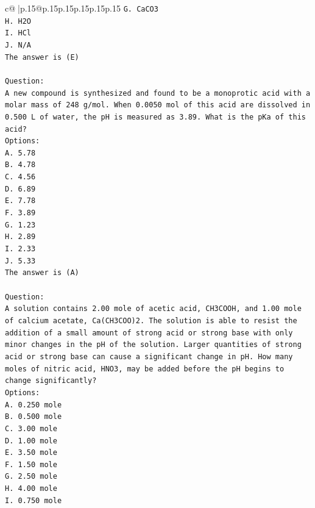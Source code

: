 \documentclass{article}
\begin{document}
{\begin{supertabular}{c@{$\;$}|p{.15\linewidth}@{}p{.15\linewidth}p{.15\linewidth}p{.15\linewidth}p{.15\linewidth}p{.15\linewidth}}
{{{\texttt{G. CaCO3} \\
\texttt{H. H2O} \\
\texttt{I. HCl} \\
\texttt{J. N/A} \\
\texttt{The answer is (E)} \\
\\ 
\texttt{Question:} \\
\texttt{A new compound is synthesized and found to be a monoprotic acid with a molar mass of 248 g/mol. When 0.0050 mol of this acid are dissolved in 0.500 L of water, the pH is measured as 3.89. What is the pKa of this acid?} \\
\texttt{Options:} \\
\texttt{A. 5.78} \\
\texttt{B. 4.78} \\
\texttt{C. 4.56} \\
\texttt{D. 6.89} \\
\texttt{E. 7.78} \\
\texttt{F. 3.89} \\
\texttt{G. 1.23} \\
\texttt{H. 2.89} \\
\texttt{I. 2.33} \\
\texttt{J. 5.33} \\
\texttt{The answer is (A)} \\
\\ 
\texttt{Question:} \\
\texttt{A solution contains 2.00 mole of acetic acid, CH3COOH, and 1.00 mole of calcium acetate, Ca(CH3COO)2. The solution is able to resist the addition of a small amount of strong acid or strong base with only minor changes in the pH of the solution. Larger quantities of strong acid or strong base can cause a significant change in pH. How many moles of nitric acid, HNO3, may be added before the pH begins to change significantly?} \\
\texttt{Options:} \\
\texttt{A. 0.250 mole} \\
\texttt{B. 0.500 mole} \\
\texttt{C. 3.00 mole} \\
\texttt{D. 1.00 mole} \\
\texttt{E. 3.50 mole} \\
\texttt{F. 1.50 mole} \\
\texttt{G. 2.50 mole} \\
\texttt{H. 4.00 mole} \\
\texttt{I. 0.750 mole} \\
}}}
\end{supertabular}}
\end{document}
